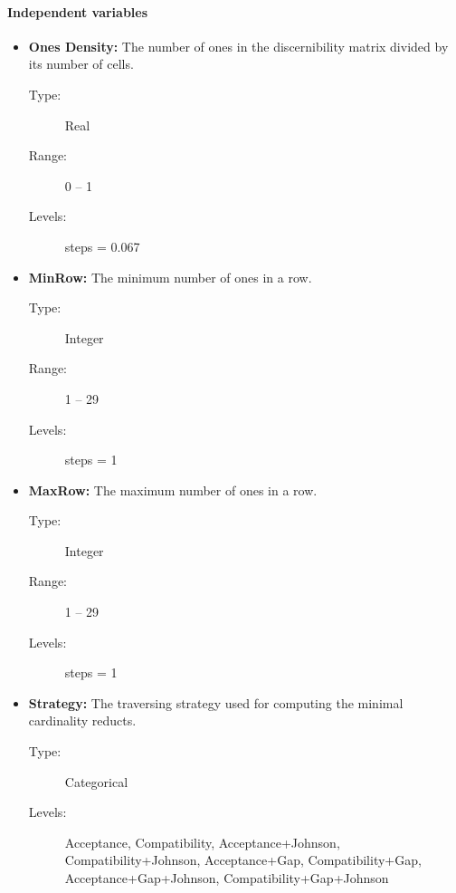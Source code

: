 \documentclass[11pt]{article}   %
\begin{document}
  \paragraph{Independent variables}  
  	\begin{itemize}
  	   \item \textbf{Ones Density:} The number of ones in the discernibility matrix divided by its number of
  	   								 cells.
  	   		\begin{description}
  	   			\item[Type:] Real
  	   			\item[Range:] 0 -- 1
  	   			\item[Levels:] steps = 0.067
  	   		\end{description}
  	   \item \textbf{MinRow:} The minimum number of ones in a row.
  	   		\begin{description}
  	   			\item[Type:] Integer
  	   			\item[Range:] 1 -- 29
  	   			\item[Levels:] steps = 1
  	   		\end{description}
  	   \item \textbf{MaxRow:} The maximum number of ones in a row.
  	   		\begin{description}
  	   			\item[Type:] Integer
  	   			\item[Range:] 1 -- 29
  	   			\item[Levels:] steps = 1
  	   		\end{description}
  	   \item \textbf{Strategy:} The traversing strategy used for computing the minimal cardinality reducts.
  	   		\begin{description}
  	   			\item[Type:] Categorical
  	   			\item[Levels:] Acceptance, Compatibility, Acceptance+Johnson, Compatibility+Johnson, 
  	   						   Acceptance+Gap, Compatibility+Gap, Acceptance+Gap+Johnson, 
  	   						   Compatibility+Gap+Johnson
  	   		\end{description}
    \end{itemize}	
\end{document}

